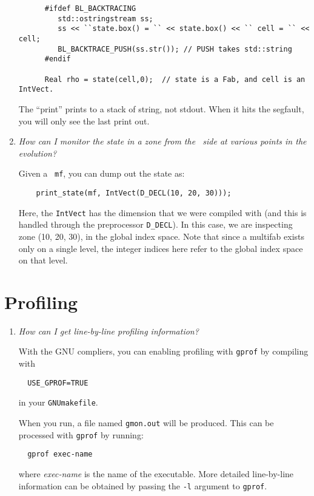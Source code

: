 \begin{enumerate}
\begin{verbatim}
      #ifdef BL_BACKTRACING
         std::ostringstream ss;
         ss << ``state.box() = `` << state.box() << `` cell = `` << cell;
         BL_BACKTRACE_PUSH(ss.str()); // PUSH takes std::string
      #endif

      Real rho = state(cell,0);  // state is a Fab, and cell is an IntVect.
\end{verbatim}          

    The ``print'' prints to a stack of string, not stdout.  When it
    hits the segfault, you will only see the last print out.



\item {\em How can I monitor the state in a zone from the \cpp\ side
  at various points in the evolution?}

  Given a \multifab\ {\tt mf}, you can dump out the state as:
\begin{verbatim}
    print_state(mf, IntVect(D_DECL(10, 20, 30)));
\end{verbatim}
  Here, the {\tt IntVect} has the dimension that we were compiled with
  (and this is handled through the preprocessor {\tt D\_DECL}).  In
  this case, we are inspecting zone (10, 20, 30), in the global index
  space.  Note that since a multifab exists only on a single level, the
  integer indices here refer to the global index space on that level.

\end{enumerate}


\section{Profiling}

\begin{enumerate}

\item {\em How can I get line-by-line profiling information?}

  With the GNU compliers, you can enabling profiling with {\tt gprof}
  by compiling with
\begin{verbatim}
  USE_GPROF=TRUE
\end{verbatim}
  in your {\tt GNUmakefile}.

  When you run, a file named {\tt gmon.out} will be produced.  This can
  be processed with {\tt gprof} by running:
\begin{verbatim}
  gprof exec-name
\end{verbatim}
  where {\em exec-name} is the name of the executable.  More detailed
  line-by-line information can be obtained by passing the {\tt -l}
  argument to {\tt gprof}.

\end{enumerate}


